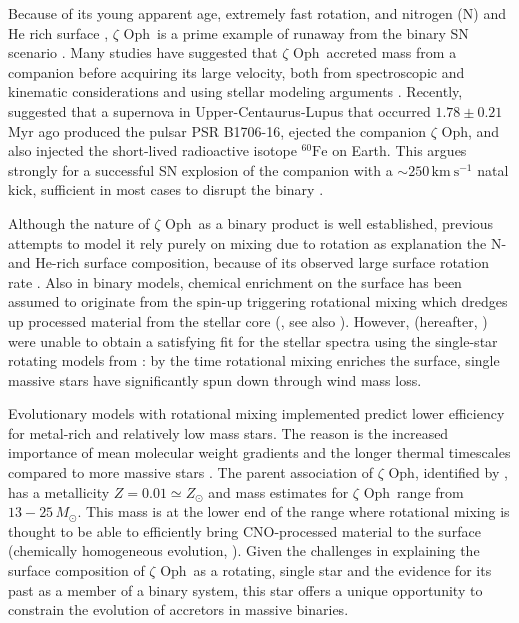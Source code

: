 \documentclass[twocolumn,twocolappendix,trackchanges]{aastex63}
\newcommand{\kms}{{\mathrm{km\ s^{-1}}}}
\newcommand{\zoph}{$\zeta$ Oph}
\begin{document}
Because of its young apparent age, extremely fast rotation, and
nitrogen (N) and He rich surface \citep[e.g.,][]{herrero:92,
  blaauw:93, villamariz:05, marcolino:09}, \zoph\ is a prime example
of runaway from the binary SN scenario \citep{blaauw:93}. Many studies
have suggested that \zoph\ accreted mass from a companion before
acquiring its large velocity, both from spectroscopic and kinematic
considerations \citep[e.g.,][]{blaauw:93, hoogerwerf:00,
  hoogerwerf:01, tetzlaff:10, neuhauser:20} and using stellar modeling
arguments \citep[e.g.,][]{vanrensbergen:96}. Recently,
\cite{neuhauser:20} suggested that a supernova in
Upper-Centaurus-Lupus that occurred $1.78\pm0.21$\,Myr ago produced the pulsar PSR B1706-16, ejected the companion \zoph,
and also injected the short-lived radioactive isotope
$^{60}\mathrm{Fe}$ on Earth. This argues strongly for a successful SN
explosion of the companion with a $\sim 250\,\kms$ natal kick,
sufficient in most cases to disrupt the binary
\citep[e.g.,][]{tauris:15, renzo:19walk, evans:20}.

Although the nature of \zoph\ as a binary product is well established, previous attempts
to model it rely purely on mixing due to rotation as explanation the N- and
He-rich surface composition, because of its observed large surface rotation rate \cite[e.g.,][]{maeder:00}. Also in binary models, chemical enrichment on the surface has been assumed to originate from the spin-up triggering rotational mixing which dredges up processed material from the stellar core (\citealt{vanrensbergen:96}, see also \citealt{cantiello:07}). However, \cite{villamariz:05}
(hereafter, ) were unable to obtain a satisfying fit
for the stellar spectra using the single-star rotating models from
\cite{meynet:00, meynet:03}: by the time rotational mixing enriches
the surface, single massive stars have significantly spun down through
wind mass loss.

Evolutionary models with rotational mixing implemented 
predict lower efficiency for metal-rich and relatively low mass
stars. The reason is the increased importance of mean molecular weight
gradients and the longer thermal timescales compared to more massive
stars \citep[e.g.,][]{yoon:06, perna:14}. The parent association of
\zoph, identified by \cite{neuhauser:20}, has a metallicity
$Z=0.01\simeq Z_\odot$ \citep[based on asteroseismology
from][]{murphy:21} and mass estimates for \zoph\ range from
$13-25\,M_\odot$. This mass is at the lower end of the range where rotational
mixing is thought to be able to efficiently bring CNO-processed material to the
surface (chemically homogeneous evolution, \citealt{maeder:00}). 
%
Given the challenges in explaining the surface composition of \zoph\
as a rotating, single star and the evidence for its past as a member of
a binary system, this star offers a unique opportunity to constrain
the evolution of accretors in massive binaries.
\end{document}
